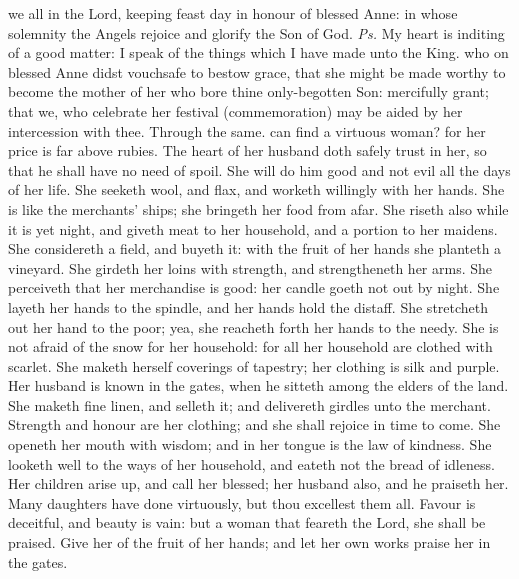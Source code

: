 \introit
{} we all in the Lord, keeping feast day in honour of blessed Anne: in whose solemnity the Angels rejoice and glorify the Son of God. \textit{Ps.} My heart is inditing of a good matter: I speak of the things which I have made unto the King.
\collect
{} who on blessed Anne didst vouchsafe to bestow grace, that she might be made worthy to become the mother of her who bore thine only-begotten Son: mercifully grant; that we, who celebrate her festival (commemoration) may be aided by her intercession with thee. Through the same.
 can find a virtuous woman? for her price is far above rubies. The heart of her husband doth safely trust in her, so that he shall have no need of spoil. She will do him good and not evil all the days of her life. She seeketh wool, and flax, and worketh willingly with her hands. She is like the merchants’ ships; she bringeth her food from afar. She riseth also while it is yet night, and giveth meat to her household, and a portion to her maidens. She considereth a field, and buyeth it: with the fruit of her hands she planteth a vineyard. She girdeth her loins with strength, and strengtheneth her arms. She perceiveth that her merchandise is good: her candle goeth not out by night. She layeth her hands to the spindle, and her hands hold the distaff. She stretcheth out her hand to the poor; yea, she reacheth forth her hands to the needy. She is not afraid of the snow for her household: for all her household are clothed with scarlet. She maketh herself coverings of tapestry; her clothing is silk and purple. Her husband is known in the gates, when he sitteth among the elders of the land. She maketh fine linen, and selleth it; and delivereth girdles unto the merchant. Strength and honour are her clothing; and she shall rejoice in time to come. She openeth her mouth with wisdom; and in her tongue is the law of kindness. She looketh well to the ways of her household, and eateth not the bread of idleness. Her children arise up, and call her blessed; her husband also, and he praiseth her. Many daughters have done virtuously, but thou excellest them all. Favour is deceitful, and beauty is vain: but a woman that feareth the Lord, she shall be praised. Give her of the fruit of her hands; and let her own works praise her in the gates.
